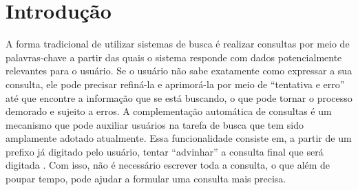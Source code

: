 \cleardoublepage
\section{Introdução}

 A forma tradicional de utilizar sistemas de busca é realizar consultas por meio de palavras-chave a partir das quais o sistema responde com dados potencialmente relevantes para o usuário. Se o usuário não sabe exatamente como expressar a sua consulta, ele pode precisar refiná-la e aprimorá-la por meio de ``tentativa e erro'' até que encontre a informação que se está buscando, o que pode  tornar o processo demorado e sujeito a erros. A complementação automática de consultas é um mecanismo que pode auxiliar usuários na tarefa de busca que tem sido amplamente adotado atualmente. Essa funcionalidade consiste em, a partir de um prefixo já digitado pelo usuário, tentar ``advinhar'' a consulta final que será digitada \citep{santo2015}. Com isso, não é necessário escrever toda a consulta, o que além de poupar tempo, pode ajudar a formular uma consulta mais precisa.

